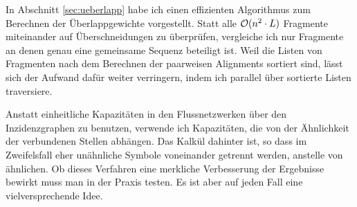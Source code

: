 In Abschnitt \ref{sec:ueberlapp} habe ich einen effizienten Algorithmus zum Berechnen der Überlappgewichte vorgestellt. Statt alle $\mathcal{O}(n^2\cdot L)$ Fragmente miteinander auf Überschneidungen zu überprüfen, vergleiche ich nur Fragmente an denen genau eine gemeinsame Sequenz beteiligt ist. Weil die Listen von Fragmenten nach dem Berechnen der paarweisen Alignments sortiert sind, lässt sich der Aufwand dafür weiter verringern, indem ich parallel über sortierte Listen traversiere.

Anstatt einheitliche Kapazitäten in den Flussnetzwerken über den Inzidenzgraphen zu benutzen, verwende ich Kapazitäten, die von der Ähnlichkeit der verbundenen Stellen abhängen. Das Kalkül dahinter ist, so dass im Zweifelsfall eher unähnliche Symbole voneinander getrennt werden, anstelle von ähnlichen. Ob dieses Verfahren eine merkliche Verbesserung der Ergebnisse bewirkt muss man in der Praxis testen. Es ist aber auf jeden Fall eine vielversprechende Idee.













